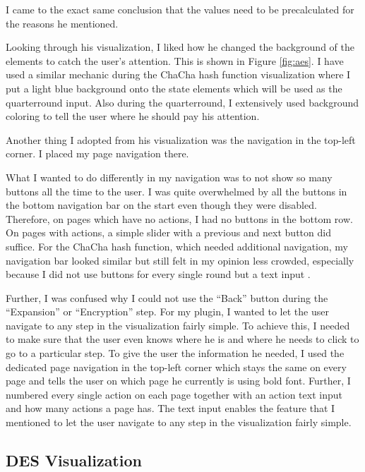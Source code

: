 I came to the exact same conclusion that the values need to be precalculated for the reasons he mentioned.

Looking through his visualization, I liked how he changed the background of the elements to catch the user's attention. This is shown in Figure \ref{fig:aes}. I have used a similar mechanic during the ChaCha hash function visualization where I put a light blue background onto the state elements which will be used as the quarterround input. Also during the quarterround, I extensively used background coloring to tell the user where he should pay his attention.

Another thing I adopted from his visualization was the navigation in the top-left corner. I placed my page navigation there.

What I wanted to do differently in my navigation was to not show so many buttons all the time to the user. I was quite overwhelmed by all the buttons in the bottom navigation bar on the start even though they were disabled. Therefore, on pages which have no actions, I had no buttons in the bottom row. On pages with actions, a simple slider with a previous and next button did suffice. For the ChaCha hash function, which needed additional navigation, my navigation bar looked similar but still felt in my opinion less crowded, especially because I did not use buttons for every single round but a text input .

Further, I was confused why I could not use the ``Back'' button during the ``Expansion'' or ``Encryption'' step. For my plugin, I wanted to let the user navigate to any step in the visualization fairly simple. To achieve this, I needed to make sure that the user even knows where he is and where he needs to click to go to a particular step. To give the user the information he needed, I used the dedicated page navigation in the top-left corner which stays the same on every page and tells the user on which page he currently is using bold font. Further, I numbered every single action on each page together with an action text input and how many actions a page has. The text input enables the feature that I mentioned to let the user navigate to any step in the visualization fairly simple.

\subsection{DES Visualization}
\label{sec:desVisualization}


